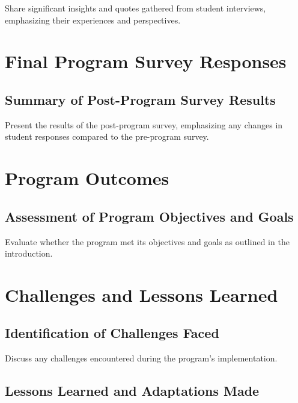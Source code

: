 \documentclass[
]{article}
\begin{document}
Share significant insights and quotes gathered from student interviews,
emphasizing their experiences and perspectives.

\hypertarget{final-program-survey-responses}{%
\section{Final Program Survey
Responses}\label{final-program-survey-responses}}

\hypertarget{summary-of-post-program-survey-results}{%
\subsection{Summary of Post-Program Survey
Results}\label{summary-of-post-program-survey-results}}

Present the results of the post-program survey, emphasizing any changes
in student responses compared to the pre-program survey.

\hypertarget{program-outcomes}{%
\section{Program Outcomes}\label{program-outcomes}}

\hypertarget{assessment-of-program-objectives-and-goals}{%
\subsection{Assessment of Program Objectives and
Goals}\label{assessment-of-program-objectives-and-goals}}

Evaluate whether the program met its objectives and goals as outlined in
the introduction.

\hypertarget{challenges-and-lessons-learned}{%
\section{Challenges and Lessons
Learned}\label{challenges-and-lessons-learned}}

\hypertarget{identification-of-challenges-faced}{%
\subsection{Identification of Challenges
Faced}\label{identification-of-challenges-faced}}

Discuss any challenges encountered during the program's implementation.

\hypertarget{lessons-learned-and-adaptations-made}{%
\subsection{Lessons Learned and Adaptations
Made}\label{lessons-learned-and-adaptations-made}}
\end{document}
